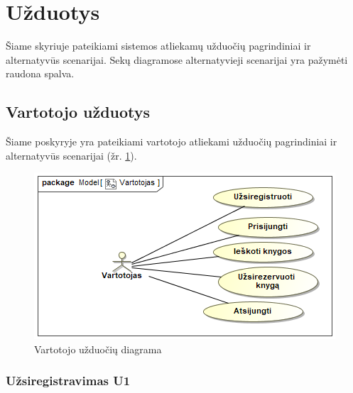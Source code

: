 \documentclass{VUMIFPSkursinis}
\begin{document}
\section{Užduotys}

Šiame skyriuje pateikiami sistemos atliekamų užduočių pagrindiniai ir alternatyvūs scenarijai. Sekų diagramose alternatyvieji scenarijai yra pažymėti raudona spalva.

\subsection{Vartotojo užduotys}

Šiame poskyryje yra pateikiami vartotojo atliekami užduočių pagrindiniai ir alternatyvūs scenarijai (žr. \ref{fig:ucVart}).

\begin{figure}[H]

\label{fig:ucVart}
    \centering
    \includegraphics[width=1\textwidth]{vidines/ucVart}
    \caption{Vartotojo užduočių diagrama}

\end{figure}

\pagebreak

\subsubsection{Užsiregistravimas U1}
\end{document}
